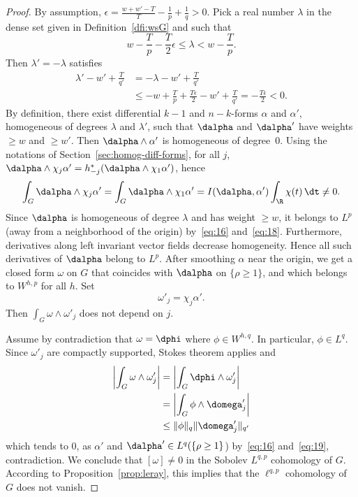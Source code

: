 \begin{proof}
By assumption, $\epsilon=\frac{w+w'-T}{T}-\frac{1}{p}+\frac{1}{q}>0$. Pick a real number $\lambda$ in the dense set given in Definition~\ref{dfi:wsG} and such that
\begin{equation}\label{eq:18}
w-\frac{T}{p}-\frac{T}{2}\epsilon \leq \lambda < w-\frac{T}{p}.
\end{equation}
Then $\lambda'=-\lambda$ satisfies
\begin{align}
\lambda'-w'+\frac{T}{q'} & = -\lambda - w' + \frac{T}{q'} \nonumber \\
& \leq -w + \frac{T}{p} + \frac{T\epsilon}{2} -w' + \frac{T}{q'} = - \frac{T\epsilon}{2} < 0. \label{eq:19}
\end{align}
By definition, there exist differential $k-1$ and $n-k$-forms $\alpha$ and $\alpha'$, homogeneous of degrees $\lambda$ and $\lambda'$, such that $\dalpha$ and $\dalpha'$ have weights $\geq w$ and $\geq w'$. Then $\dalpha \wedge \alpha'$ is homogeneous of degree~$0$. Using the notations of Section~\ref{sec:homog-diff-forms}, for all $j$, $\dalpha\wedge \chi_j\alpha'= h_{-j}^*(\dalpha\wedge \chi_1
\alpha')$, hence
\[
\int_{G} \dalpha \wedge \chi_j\alpha'=\int_{G} \dalpha \wedge
\chi_1\alpha'=I(\dalpha,\alpha')\int_{\R}\chi(t)\,\dt\not=0.
\]
Since $\dalpha$ is homogeneous of degree $\lambda$ and has weight $\geq w$, it belongs to $L^p$ (away from a neighborhood of the origin) by~\eqref{eq:16} and~\eqref{eq:18}. Furthermore, derivatives along left invariant vector fields decrease homogeneity. Hence all such derivatives of $\dalpha$ belong to $L^p$. After smoothing $\alpha$ near the origin, we get a closed form $\omega$ on $G$ that coincides with $\dalpha$ on $\{\rho \geq 1\}$, and which belongs to $W^{h,p}$ for all $h$. Set
\[
\omega'_j=\chi_j \alpha'.
\]
Then $\int_{G}\omega\wedge \omega'_j$ does not depend on $j$.

Assume by contradiction that $\omega=\dphi$ where $\phi\in W^{h,q}$. In particular, $\phi\in L^q$. Since $\omega'_j$ are compactly supported, Stokes theorem applies and
\begin{align*}
\left|\int_{G}\omega\wedge \omega'_j\right| &=\left|\int_{G}\dphi\wedge \omega'_j\right|\\
&=\left|\int_{G}\phi\wedge \domega'_j\right|\\
&\leq\|\phi\|_{q}\|\domega'_j\|_{q'}
\end{align*}
which tends to $0$, as $\alpha'$ and $\dalpha' \in L^q(\{\rho \geq 1\}$) by~\eqref{eq:16} and~\eqref{eq:19}, contradiction. We conclude that $[\omega]\not=0$ in the Sobolev $L^{q,p}$ cohomology of $G$. According to Proposition~\ref{prop:leray}, this implies that the $\ell^{q,p}$ cohomology of $G$ does not vanish.
\end{proof}

